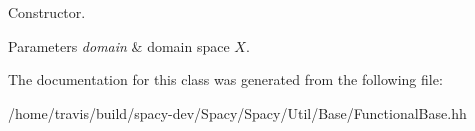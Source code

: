 Constructor. 


\begin{DoxyParams}{Parameters}
{\em domain} & domain space $X$. \\
\hline
\end{DoxyParams}


The documentation for this class was generated from the following file\-:\begin{DoxyCompactItemize}
\item 
/home/travis/build/spacy-\/dev/\-Spacy/\-Spacy/\-Util/\-Base/Functional\-Base.\-hh\end{DoxyCompactItemize}
